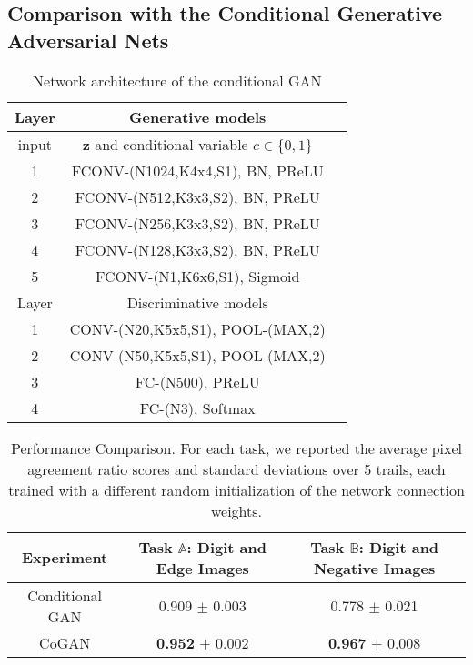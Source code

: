 \documentclass{article}
\begin{document}
\subsection{Comparison with the Conditional Generative Adversarial Nets}\label{subsec::cgan}



\begin{table}[thb!]
\small
\centering
{
\caption{Network architecture of the conditional GAN}
\label{tbl::cgan}
\begin{tabular}{|c|c|c|}
\hline\rule{0pt}{2ex}    
Layer &  Generative models \\
\hline 
input &  $\mathbf{z}$ and conditional variable $c\in\{0,1\}$ \\
1 &  FCONV-(N1024,K4x4,S1), BN, PReLU \\
2 &  FCONV-(N512,K3x3,S2), BN, PReLU \\
3 &  FCONV-(N256,K3x3,S2), BN, PReLU \\
4 &  FCONV-(N128,K3x3,S2), BN, PReLU \\
5 &  FCONV-(N1,K6x6,S1), Sigmoid \\
\hline
\hline\rule{0pt}{2ex} 
Layer &  Discriminative models \\
\hline\rule{0pt}{2ex} 
1 & CONV-(N20,K5x5,S1), POOL-(MAX,2) \\
2 & CONV-(N50,K5x5,S1), POOL-(MAX,2) \\
3 & FC-(N500), PReLU \\
4 & FC-(N3), Softmax \\
\hline
\end{tabular}}
\end{table}

\begin{table}[thb!]
\centering
{ 
\caption{Performance Comparison. For each task, we reported the average pixel agreement ratio scores and standard deviations over 5 trails, each trained with a different random initialization of the network connection weights.}
\label{tbl::cgan_perf}
\begin{tabular}{|c|c|c|}
\hline
Experiment & Task $\mathbb{A}$: Digit and Edge Images & Task $\mathbb{B}$: Digit and Negative Images \\
\hline
Conditional GAN & 0.909 $\pm$ 0.003 & 0.778 $\pm$ 0.021\\
CoGAN & {\bf 0.952} $\pm$ 0.002 & {\bf 0.967} $\pm$ 0.008\\
\hline
\end{tabular}}
\end{table}
\end{document}
